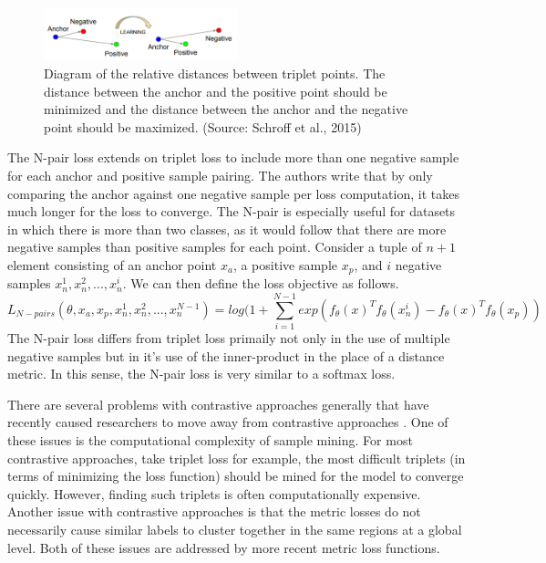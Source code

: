 \documentclass[./dissertation.tex]{subfiles}
\begin{document}
    \begin{figure}[h]
        \centering\includegraphics[width=0.5\textwidth]{figures/triplet_loss_figure}
        \caption{Diagram of the relative distances between triplet points. The distance between the anchor and the positive point should be minimized and the distance between the anchor and the negative point should be maximized. (Source: Schroff et al., 2015)}
        \label{Triplet Loss Diagram}
    \end{figure}
    
    The N-pair loss \cite{sohn2016improved} extends on triplet loss to include more than one negative sample for each anchor and positive sample pairing. The authors write that by only comparing the anchor against one negative sample per loss computation, it takes much longer for the loss to converge. The N-pair is especially useful for datasets in which there is more than two classes, as it would follow that there are more negative samples than positive samples for each point. Consider a tuple of $n + 1$ element consisting of an anchor point $x_{a}$, a positive sample $x_{p}$, and $i$ negative samples $x_{n}^{1}, x_{n}^{2}, ..., x_{n}^{i}$. We can then define the loss objective as follows.
    \begin{equation*}
    L_{N-pairs}(\theta, x_{a}, x_{p}, x_{n}^{1}, x_{n}^{2}, ..., x_{n}^{N - 1}) = log(1 + \sum_{i=1}^{N-1} 
    exp(f_{\theta}(x)^{T} f_{\theta}(x_{n}^{i}) 
    - f_{\theta}(x)^{T} f_{\theta}(x_{p})
    )
    \end{equation*} 
    The N-pair loss differs from triplet loss primaily not only in the use of multiple negative samples but in it's use of the inner-product in the place of a distance metric. In this sense, the N-pair loss is very similar to a softmax loss.
    
    There are several problems with contrastive approaches generally that have recently caused researchers to move away from contrastive approaches \cite{hav4ik2021deepmetriclearning}. One of these issues is the computational complexity of sample mining. For most contrastive approaches, take triplet loss for example, the most difficult triplets (in terms of minimizing the loss function) should be mined for the model to converge quickly. However, finding such triplets is often computationally expensive. Another issue with contrastive approaches is that the metric losses do not necessarily cause similar labels to cluster together in the same regions at a global level. Both of these issues are addressed by more recent metric loss functions.
    
\end{document}
